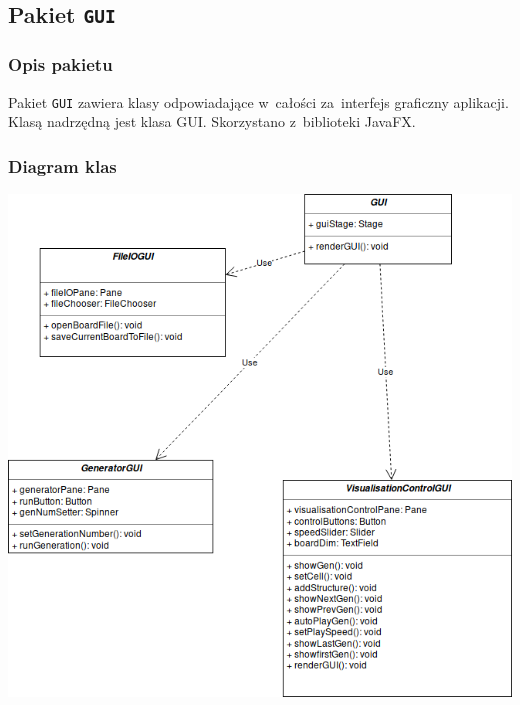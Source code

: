 \documentclass[a4paper,11pt]{article}
\begin{document}
        \subsection{Pakiet \texttt{GUI} }
            \subsubsection{Opis pakietu}
            Pakiet \texttt{GUI} zawiera klasy odpowiadające w~całości za~interfejs graficzny aplikacji. Klasą nadrzędną jest klasa GUI. Skorzystano z~biblioteki JavaFX.
            \subsubsection{Diagram klas}
            \begin{center}
 \includegraphics[scale=0.5]{images/pakiet_gui.png}
\end{center}
\end{document}
